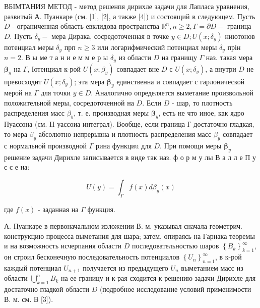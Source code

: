 \documentclass[10pt]{article}
\begin{document}
ВБІМТАНИЯ МЕТОД - метод решенпя дирихле задачи для Лапласа уравнения, развитый А. Пуанкаре (см. [1], [2], а также [4]) и состоящий в следующем. Пусть $D$ - ограниченная область евклидова пространства $\mathbb{R}^{n}, n \geqslant 2, \Gamma=\partial D-$ граница $D$. Пусть $\delta_{y}-$ мера Дирака, сосредоточенная в точке $y \in D ; U\left(x ; \delta_{y}\right)$ ниютонов потенциал меры $\delta_{y}$ прп $n \geqslant 3$ или логарифмический потенциал меры $\delta_{y}$ прін $n=2$. В ы ме т а н и е м м е р ы $\delta_{y}$ из области $D$ на гранищу $\Gamma$ наз. такая мера $\boldsymbol{\beta}_{y}$ на $\Gamma$, Іотенциал к-рой $U\left(x ; \beta_{y}\right)$ совпадает вне $D$ с $U\left(x ; \delta_{y}\right)$, а внутри $D$ не превосходит $U\left(x ; \delta_{y}\right)$; эта мера $\boldsymbol{\beta}_{y}$ единственна и совпадает с гарлонической мерой на $\Gamma$ для точки $y \in D$. Аналогично определяется выметание произвольной положительной меры, сосредоточенной на $D$. Если $D$ - шар, то плотность распределения масс $\beta_{y}$, т. е. производная меры $\boldsymbol{\beta}_{y}$, есть не что иное, как ядро Пуассона (см. II уассоиа интеграл). Вообще, если граница Г достаточно гладкая, то мера $\beta_{y}$ абсолютно непрерывна и плотность распределения масс $\beta_{y}$ совпадает с нормальной производной $\Gamma$ рина функциu для $D$. При помощи меры $\boldsymbol{\beta}_{y}$ решение задачи Дирихле записывается в виде так наз. ф о р м у лы В а л л е П у с с е на:



\[

U(y)=\int_{\Gamma} f(x) d \beta_{y}(x)

\]



где $f(x)$ - заданная на $\Gamma$ функция.



А. Пуанкаре в первоначальном изложении В. м. указывал сначала геометрич. конструкцию процесса выметания для шара; затем, опираясь на Гарнака теоремы и на возможность исчерпания области $D$ последовательностью шаров $\left\{B_{k}\right\}_{k=1}^{\infty}$, он строил бесконечную последовательность потенциалов $\left\{U_{n}\right\}_{n=1}^{\infty}$, в к-рой каждый потенциал $U_{n+1}$ получается из предыдущего $U_{n}$ выметанием масс из области $\bigcup_{k=1}^{n} B_{k}$ на ее границу и к-рая сходится к решению задачи Дирихле для достаточно гладкой области $D$ (подробное исследование условий применимости В. м. см. В [3]).
\end{document}
